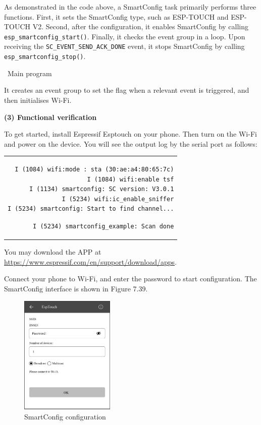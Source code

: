 \documentclass[a4paper,12pt,openany]{book}
\renewcommand{\ttfamily}{\fontfamily{pcr}\selectfont}
\renewcommand{\arraystretch}{1}
\newenvironment{codebloc}{ %
    \ttfamily\footnotesize
    \renewcommand{\arraystretch}{1}
}
\newcommand{\note}[2][NOTE]{ %
\vspace{6pt}
\begin{tabular}{b{\textwidth}}
\hline
\fontfamily{phv}\selectfont \textbf{#1}\\
\leftskip 1em #2\\
\hline
\end{tabular}
}
\begin{document}
As demonstrated in the code above, a SmartConfig task primarily performs three functions. First, it sets the SmartConfig type, such as ESP-TOUCH and ESP-TOUCH V2. Second, after the configuration, it enables SmartConfig by calling \verb|esp_smartconfig_start()|. Finally, it checks the event group in a loop. Upon receiving the \verb|SC_EVENT_SEND_ACK_DONE| event, it stops SmartConfig by calling \verb|esp_smartconfig_stop()|.

\textbullet\ Main program

It creates an event group to set the flag when a relevant event is triggered, and then initialises Wi-Fi.

\textbf{(3) Functional verification}

To get started, install Espressif Esptouch on your phone. Then turn on the Wi-Fi and power on the device. You will see the output log by the serial port as follows:

\begin{codebloc}
\begin{tabular}{d}
\vspace{2pt}
\begin{verbatim}
I (1084) wifi:mode : sta (30:ae:a4:80:65:7c)
I (1084) wifi:enable tsf
I (1134) smartconfig: SC version: V3.0.1
I (5234) wifi:ic_enable_sniffer
I (5234) smartconfig: Start to find channel...
\end{verbatim}
\verb|I (5234) smartconfig_example: Scan done|
\end{tabular}
\end{codebloc}

\note{You may download the APP at \url{https://www.espressif.com/en/support/download/apps}.}

Connect your phone to Wi-Fi, and enter the password to start configuration. The SmartConfig interface is shown in Figure 7.39.

\begin{figure}[!h]
    \centering
    \includegraphics[width=0.4\textwidth]{D7Z/7-39}
    \caption{SmartConfig configuration}
\end{figure}
\end{document}
